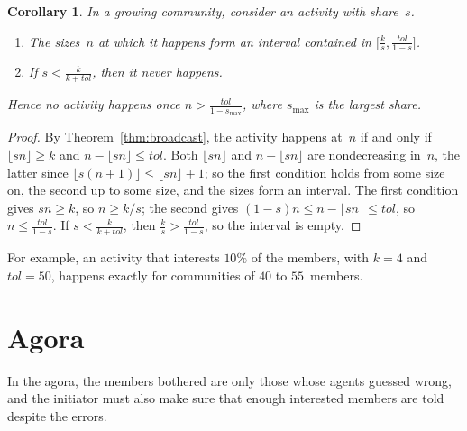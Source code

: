 \documentclass[11pt]{article}
\newtheorem{corollary}{Corollary}
\theoremstyle{definition}
\newcommand{\tol}{\mathit{tol}}
\begin{document}
\begin{corollary}\label{cor:broadcast}
In a growing community, consider an activity with share~$s$.
\begin{enumerate}
\item The sizes~$n$ at which it happens form an interval contained in $\big[\frac{k}{s}, \frac{\tol}{1-s}\big]$.
\item If $s < \frac{k}{k + \tol}$, then it never happens.
\end{enumerate}
Hence no activity happens once $n > \frac{\tol}{1-s_{\max}}$, where $s_{\max}$ is the largest share.
\end{corollary}
\begin{proof}
By Theorem~\ref{thm:broadcast}, the activity happens at~$n$ if and only if $\lfloor sn \rfloor \ge k$ and $n - \lfloor sn \rfloor \le \tol$. Both $\lfloor sn \rfloor$ and $n - \lfloor sn \rfloor$ are nondecreasing in~$n$, the latter since $\lfloor s(n+1) \rfloor \le \lfloor sn \rfloor + 1$; so the first condition holds from some size on, the second up to some size, and the sizes form an interval. The first condition gives $sn \ge k$, so $n \ge k/s$; the second gives $(1-s)n \le n - \lfloor sn \rfloor \le \tol$, so $n \le \frac{\tol}{1-s}$. If $s < \frac{k}{k+\tol}$, then $\frac{k}{s} > \frac{\tol}{1-s}$, so the interval is empty.
\end{proof}

For example, an activity that interests $10\%$ of the members, with $k=4$ and $\tol=50$, happens exactly for communities of $40$ to $55$~members.

\section{Agora}
In the agora, the members bothered are only those whose agents guessed wrong, and the initiator must also make sure that enough interested members are told despite the errors.
\end{document}
